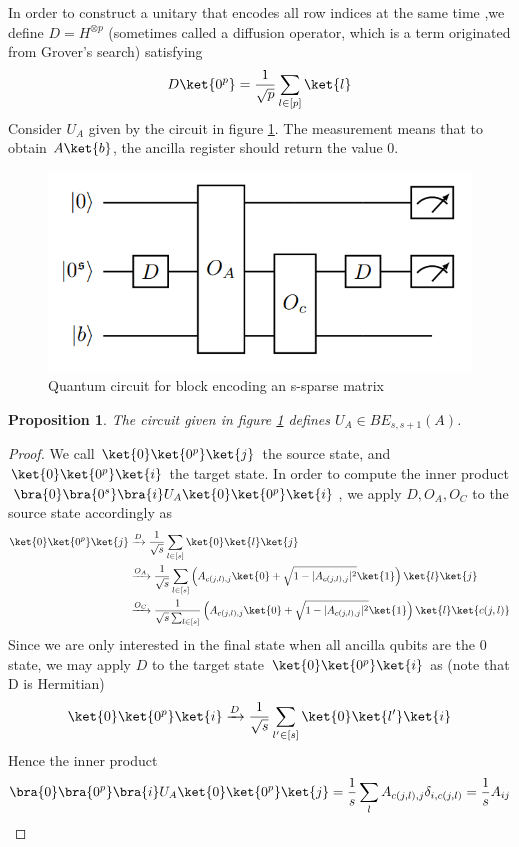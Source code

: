 \documentclass[12pt, oneside]{book}
\newtheorem{proposition}[theorem]{Proposition}
\theoremstyle{definition}
\theoremstyle{definition}
\theoremstyle{remark}
\begin{document}
In order to construct a unitary that encodes all row indices at the same time ,we define $D=H^{\otimes p}$ (sometimes called a diffusion operator, which is a term originated from Grover's search) satisfying
\[
D\ket{0^p}=\frac{1}{\sqrt{p}}\sum_{l\in[p]}\ket{l}
\]
Consider $U_A$ given by the circuit in figure \ref{fig:sparseblockencoding}. The measurement means that to obtain $A\ket{b}$, the ancilla register should return the value 0.
\begin{figure}
    \centering
    \includegraphics[width=0.5\linewidth]{../images/sparseblockencoding.png}
    \caption{Quantum circuit for block encoding an s-sparse matrix}
    \label{fig:sparseblockencoding}
\end{figure}
\begin{proposition}
    The circuit given in figure \ref{fig:sparseblockencoding} defines $U_A \in BE_{s,s+1}(A)$.
\end{proposition}
\begin{proof}
    We call $\ket{0}\ket{0^p}\ket{j}$ the source state, and $\ket{0}\ket{0^p}\ket{i}$ the target state. In order to compute the inner product $\bra{0}\bra{0^s}\bra{i}U_A\ket{0}\ket{0^p}\ket{i}$, we apply $D,O_A,O_C$ to the source state accordingly as
    \begin{align*}
    \ket{0}\ket{0^p}\ket{j}&\xrightarrow{D}\frac{1}{\sqrt{s}}\sum_{l\in[s]}\ket{0}\ket{l}\ket{j}\\
    &\xrightarrow{O_A}\frac{1}{\sqrt{s}}\sum_{l\in[s]}\left(A_{c(j,l),j}\ket{0}+\sqrt{1-|A_{c(j,l),j}|^2}\ket{1}\right)\ket{l}\ket{j}\\
    &\xrightarrow{O_C}\frac{1}{\sqrt{s}\sum_{l\in[s]}}\left(A_{c(j,l),j}\ket{0}+\sqrt{1-|A_{c(j,l),j}|^2}\ket{1}\right)\ket{l}\ket{c(j,l)}
    \end{align*}
    Since we are only interested in the final state when all ancilla qubits are the 0 state, we may apply $D$ to the target state $\ket{0}\ket{0^p}\ket{i}$ as (note that D is Hermitian)
    \[
    \ket{0}\ket{0^p}\ket{i}\xrightarrow{D}\frac{1}{\sqrt{s}}\sum_{l'\in[s]}\ket{0}\ket{l'}\ket{i}
    \]
    Hence the inner product
    \[
    \bra{0}\bra{0^p}\bra{i}U_A\ket{0}\ket{0^p}\ket{j}=\frac{1}{s}\sum_l A_{c(j,l),j}\delta_{i,c(j,l)}=\frac{1}{s}A_{ij}
    \]
\end{proof}
\end{document}
